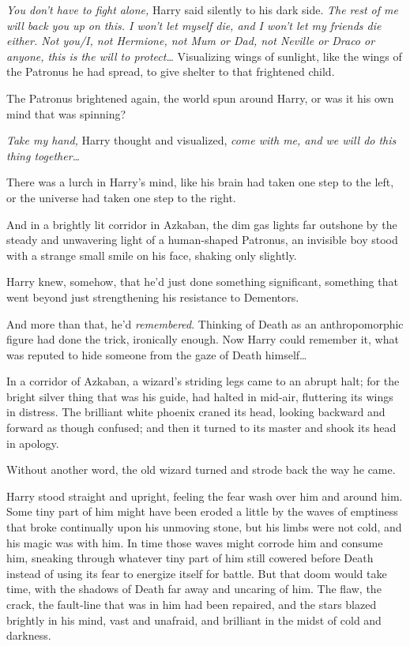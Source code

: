 \emph{You don't have to fight alone,} Harry said silently to his dark side. \emph{The rest of me will back you up on this. I won't let myself die, and I won't let my friends die either. Not you/I, not Hermione, not Mum or Dad, not Neville or Draco or anyone, this is the will to protect{\ldots}} Visualizing wings of sunlight, like the wings of the Patronus he had spread, to give shelter to that frightened child.

The Patronus brightened again, the world spun around Harry, or was it his own mind that was spinning?

\emph{Take my hand,} Harry thought and visualized, \emph{come with me, and we will do this thing together{\ldots}}

There was a lurch in Harry's mind, like his brain had taken one step to the left, or the universe had taken one step to the right.

And in a brightly lit corridor in Azkaban, the dim gas lights far outshone by the steady and unwavering light of a human-shaped Patronus, an invisible boy stood with a strange small smile on his face, shaking only slightly.

Harry knew, somehow, that he'd just done something significant, something that went beyond just strengthening his resistance to Dementors.

And more than that, he'd \emph{remembered}. Thinking of Death as an anthropomorphic figure had done the trick, ironically enough. Now Harry could remember it, what was reputed to hide someone from the gaze of Death himself{\ldots}

\later

In a corridor of Azkaban, a wizard's striding legs came to an abrupt halt; for the bright silver thing that was his guide, had halted in mid-air, fluttering its wings in distress. The brilliant white phoenix craned its head, looking backward and forward as though confused; and then it turned to its master and shook its head in apology.

Without another word, the old wizard turned and strode back the way he came.

\later

Harry stood straight and upright, feeling the fear wash over him and around him. Some tiny part of him might have been eroded a little by the waves of emptiness that broke continually upon his unmoving stone, but his limbs were not cold, and his magic was with him. In time those waves might corrode him and consume him, sneaking through whatever tiny part of him still cowered before Death instead of using its fear to energize itself for battle. But that doom would take time, with the shadows of Death far away and uncaring of him. The flaw, the crack, the fault-line that was in him had been repaired, and the stars blazed brightly in his mind, vast and unafraid, and brilliant in the midst of cold and darkness.

